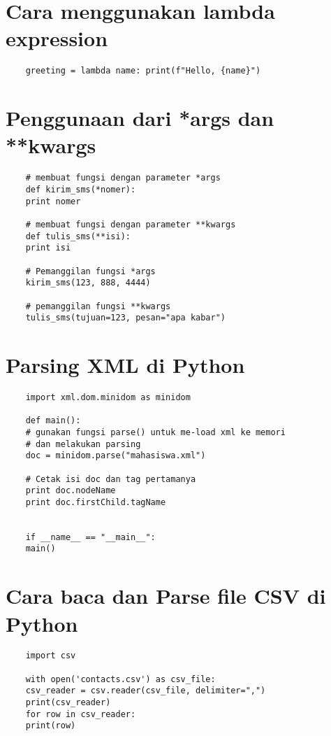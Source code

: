 \documentclass{article}
\begin{document}
\section{Cara menggunakan lambda expression}
\begin{lstlisting}
	greeting = lambda name: print(f"Hello, {name}") 
\end{lstlisting}

\section{Penggunaan dari *args dan **kwargs}
\begin{lstlisting}
	# membuat fungsi dengan parameter *args
	def kirim_sms(*nomer):
	print nomer
	
	# membuat fungsi dengan parameter **kwargs
	def tulis_sms(**isi):
	print isi
	
	# Pemanggilan fungsi *args
	kirim_sms(123, 888, 4444)
	
	# pemanggilan fungsi **kwargs
	tulis_sms(tujuan=123, pesan="apa kabar")
\end{lstlisting}

\section{Parsing XML di Python}
\begin{lstlisting}
	import xml.dom.minidom as minidom
	
	def main():
	# gunakan fungsi parse() untuk me-load xml ke memori 
	# dan melakukan parsing
	doc = minidom.parse("mahasiswa.xml")
	
	# Cetak isi doc dan tag pertamanya
	print doc.nodeName
	print doc.firstChild.tagName
	
	
	if __name__ == "__main__":
	main()
\end{lstlisting}

\section{Cara baca dan Parse file CSV di Python}
\begin{lstlisting}
	import csv
	
	with open('contacts.csv') as csv_file:
	csv_reader = csv.reader(csv_file, delimiter=",")
	print(csv_reader)
	for row in csv_reader:
	print(row)
\end{lstlisting}
\end{document}
